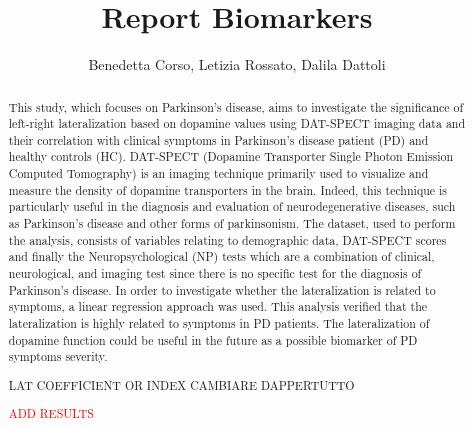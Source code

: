 \documentclass[]{article}
\title{Report Biomarkers}
\author{Benedetta Corso, Letizia Rossato, Dalila Dattoli}
\begin{document}
\maketitle

\begin{abstract}
This study, which focuses on Parkinson's disease, aims to investigate the significance of left-right lateralization based on dopamine values using DAT-SPECT imaging data and their correlation with clinical symptoms in Parkinson’s disease patient (PD) and healthy controls (HC). DAT-SPECT (Dopamine Transporter Single Photon Emission Computed Tomography) is an imaging technique primarily used to visualize and measure the density of dopamine transporters in the brain.  Indeed, this technique is particularly useful in the diagnosis and evaluation of neurodegenerative diseases, such as Parkinson's disease and other forms of parkinsonism. The dataset, used to perform the analysis, consists of variables relating to demographic data, DAT-SPECT scores and finally the Neuropsychological (NP) tests which are a combination of clinical, neurological, and imaging test since there is no specific test for the diagnosis of Parkinson’s disease. In order to investigate whether the lateralization is related to symptoms, a linear regression approach was used. This analysis verified that the lateralization is highly related to symptoms in PD patients.
The lateralization of dopamine function could be useful in the future as a possible biomarker of PD symptoms severity.

LAT COEFFICIENT OR INDEX CAMBIARE DAPPERTUTTO

\textcolor{red}{ADD RESULTS}
\newline

\end{abstract}
\end{document}
